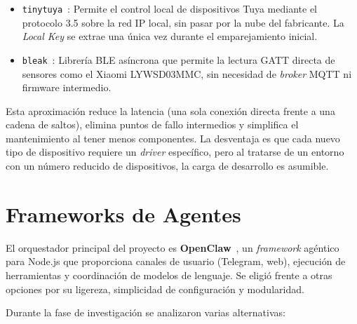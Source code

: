 \begin{itemize}
    \item \texttt{tinytuya}~\cite{tinytuya}: Permite el control local de dispositivos Tuya mediante el protocolo 3.5 sobre la red IP local, sin pasar por la nube del fabricante. La \textit{Local Key} se extrae una única vez durante el emparejamiento inicial.
    \item \texttt{bleak}~\cite{bleak}: Librería BLE asíncrona que permite la lectura GATT directa de sensores como el Xiaomi LYWSD03MMC, sin necesidad de \textit{broker} MQTT ni firmware intermedio.
\end{itemize}

Esta aproximación reduce la latencia (una sola conexión directa frente a una cadena de saltos), elimina puntos de fallo intermedios y simplifica el mantenimiento al tener menos componentes. La desventaja es que cada nuevo tipo de dispositivo requiere un \textit{driver} específico, pero al tratarse de un entorno con un número reducido de dispositivos, la carga de desarrollo es asumible.

\section{Frameworks de Agentes}

El orquestador principal del proyecto es \textbf{OpenClaw}~\cite{openclaw}, un \textit{framework} agéntico para Node.js que proporciona canales de usuario (Telegram, web), ejecución de herramientas y coordinación de modelos de lenguaje. Se eligió frente a otras opciones por su ligereza, simplicidad de configuración y modularidad.

Durante la fase de investigación se analizaron varias alternativas:

